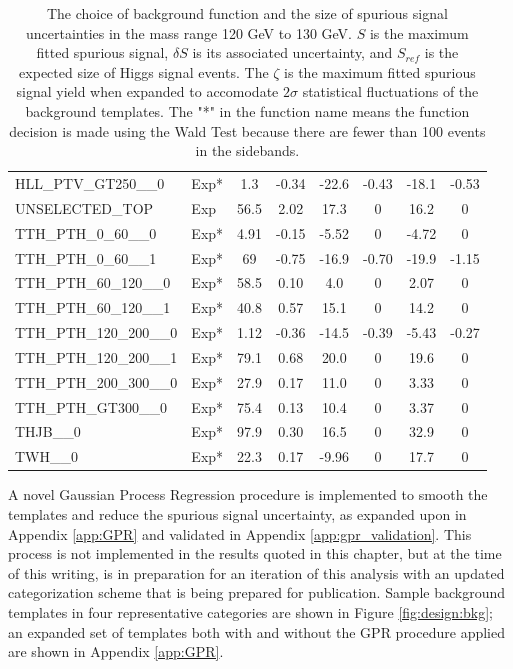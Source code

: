 \begin{table}[!h]
\begin{tabular}{llcccccc}
 HLL\_PTV\_GT250\_\_0 & Exp* & 1.3 & -0.34 & -22.6 & -0.43 & -18.1 & -0.53 \\
 UNSELECTED\_TOP & Exp & 56.5 & 2.02 & 17.3 & 0 & 16.2 & 0 \\
 TTH\_PTH\_0\_60\_\_0 & Exp* & 4.91 & -0.15 & -5.52 & 0 & -4.72 & 0 \\
 TTH\_PTH\_0\_60\_\_1 & Exp* & 69 & -0.75 & -16.9 & -0.70 & -19.9 & -1.15 \\
 TTH\_PTH\_60\_120\_\_0 & Exp* & 58.5 & 0.10 & 4.0 & 0 & 2.07 & 0 \\
 TTH\_PTH\_60\_120\_\_1 & Exp* & 40.8 & 0.57 & 15.1 & 0 & 14.2 & 0 \\
 TTH\_PTH\_120\_200\_\_0 & Exp* & 1.12 & -0.36 & -14.5 & -0.39 & -5.43 & -0.27 \\
 TTH\_PTH\_120\_200\_\_1 & Exp* & 79.1 & 0.68 & 20.0 & 0 & 19.6 & 0 \\
 TTH\_PTH\_200\_300\_\_0 & Exp* & 27.9 & 0.17 & 11.0 & 0 & 3.33 & 0 \\
 TTH\_PTH\_GT300\_\_0 & Exp* & 75.4 & 0.13 & 10.4 & 0 & 3.37 & 0 \\
 THJB\_\_0 & Exp* & 97.9 & 0.30 & 16.5 & 0 & 32.9 & 0 \\
 TWH\_\_0 & Exp* & 22.3 & 0.17 & -9.96 & 0 & 17.7 & 0 \\
       \hline
      \hline
      \end{tabular}
      \caption{The choice of background function and the size of spurious signal uncertainties in the mass range 120 GeV to 130 GeV. $S$ is the maximum fitted spurious signal, $\delta S$ is its associated uncertainty, and $S_{ref}$ is the expected size of Higgs signal events. The $\zeta$ is the maximum fitted spurious signal yield when expanded to accomodate $2\sigma$ statistical fluctuations of the background templates. The "*" in the function name means the function decision is made using the Wald Test because there are fewer than 100 events in the sidebands.
   \label{tab:spurious_sig2}   }
\end{table}

A novel Gaussian Process Regression procedure is implemented to smooth the templates and reduce the spurious signal uncertainty, as expanded upon in Appendix \ref{app:GPR} and validated in Appendix \ref{app:gpr_validation}. This process is not implemented in the results quoted in this chapter, but at the time of this writing, is in preparation for an iteration of this analysis with an updated categorization scheme that is being prepared for publication. Sample background templates in four representative categories are shown in Figure \ref{fig:design:bkg}; an expanded set of templates both with and without the GPR procedure applied are shown in Appendix \ref{app:GPR}.

